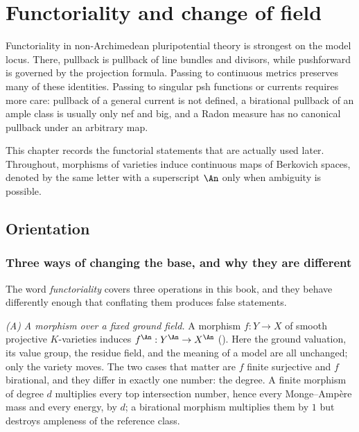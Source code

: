 \chapter{Functoriality and change of field}
\label{chap:bfj-functoriality}

Functoriality in non-Archimedean pluripotential theory is strongest on the
model locus.  There, pullback is pullback of line bundles and divisors,
while pushforward is governed by the projection formula.  Passing to
continuous metrics preserves many of these identities.  Passing to
singular psh functions or currents requires more care: pullback of a general
current is not defined, a birational pullback of an ample class is usually
only nef and big, and a Radon measure has no canonical pullback under an
arbitrary map.

This chapter records the functorial statements that are actually used later.
Throughout, morphisms of varieties induce continuous maps of Berkovich
spaces, denoted by the same letter with a superscript \(\An\) only when
ambiguity is possible.

\section{Orientation}
\label{sec:ch30-orientation}

\subsection{Three ways of changing the base, and why they are different}
\label{sec:ch30-three-kinds}

The word \emph{functoriality} covers three operations in this book, and they
behave differently enough that conflating them produces false statements.

\emph{(A) A morphism over a fixed ground field.}  A morphism \(f:Y\to X\) of
smooth projective \(K\)-varieties induces \(f^{\An}:Y^{\An}\to X^{\An}\)
().  Here the ground valuation, its value group,
the residue field, and the meaning of a model are all unchanged; only the
variety moves.  The two cases that matter are \(f\) finite surjective and
\(f\) birational, and they differ in exactly one number: the degree.  A
finite morphism of degree \(d\) multiplies every top intersection number,
hence every Monge--Amp\`ere mass and every energy, by \(d\); a birational
morphism multiplies them by \(1\) but destroys ampleness of the reference
class.

